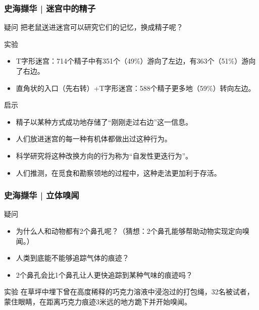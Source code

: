 \begin{frame}
  \frametitle{史海撷华 | 迷宫中的精子}
  \begin{block}{疑问}
    把老鼠送进迷宫可以研究它们的记忆，换成精子呢？
  \end{block}
  \pause
  \begin{block}{实验}
    \begin{itemize}
      \item T字形迷宫：714个精子中有351个（49\%）游向了左边，有363个（51\%）游向了右边。
      \item 直角状的入口（先右转）+T字形迷宫：588个精子更多地（59\%）转向左边。
    \end{itemize}
  \end{block}
  \pause
  \begin{block}{启示}
    \begin{itemize}
      \item 精子以某种方式成功地存储了“刚刚走过右边”这一信息。
      \item 人们放进迷宫的每一种有机体都做出过这种行为。
      \item 科学研究将这种改换方向的行为称为“自发性更迭行为”。
      \item 人们推测，在觅食和勘察领地的过程中，这种走法更加利于存活。
    \end{itemize}
  \end{block}
\end{frame}

\begin{frame}
  \frametitle{史海撷华 | 立体嗅闻}
  \begin{block}{疑问}
    \begin{itemize}
      \item 为什么人和动物都有2个鼻孔呢？（猜想：2个鼻孔能够帮助动物实现定向嗅闻。）
      \item 人类到底能不能够追踪气体的痕迹？
      \item 2个鼻孔会比1个鼻孔让人更快追踪到某种气味的痕迹吗？
    \end{itemize}
  \end{block}
  \pause
  \begin{block}{实验}
    在草坪中埋下曾在高度稀释的巧克力溶液中浸泡过的打包绳，32名被试者，蒙住眼睛，在距离巧克力痕迹3米远的地方跪下并开始嗅闻。
  \end{block}
\end{frame}

